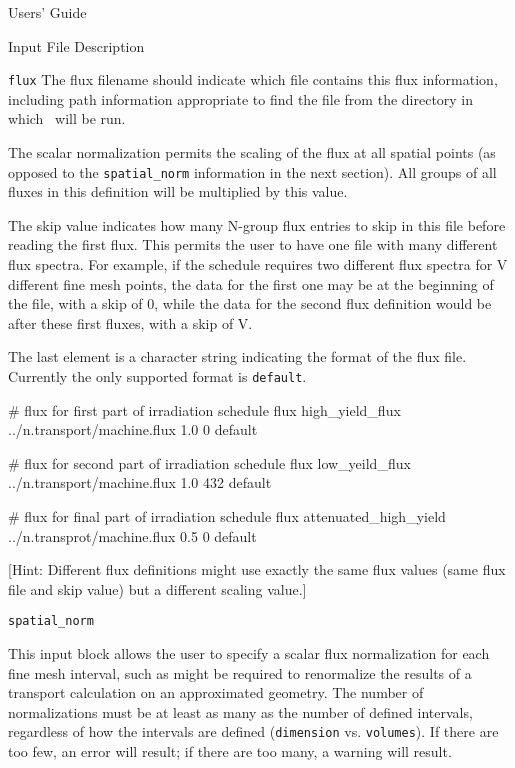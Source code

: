 \begin{chapter}{Users' Guide\label{app:user.guide}}
\begin{section}{Input File Description\label{app:user.input}}
\begin{subsection}{\texttt{flux}\label{app:user.input.flux}}
      The flux filename should indicate which file contains this flux
      information, including path information appropriate to find the
      file from the directory in which \ALARA\ will be run.

      The scalar normalization permits the scaling of the flux at all
      spatial points (as opposed to the \texttt{spatial\_norm}
      information in the next section).  All groups of all fluxes in
      this definition will be multiplied by this value.
      
      The skip value indicates how many N-group flux entries to skip
      in this file before reading the first flux.  This permits the
      user to have one file with many different flux spectra.  For
      example, if the schedule requires two different flux spectra for
      V different fine mesh points, the data for the first one may be
      at the beginning of the file, with a skip of 0, while the data
      for the second flux definition would be after these first
      fluxes, with a skip of V.
      
      The last element is a character string indicating the format of
      the flux file.  Currently the only supported format is
      \texttt{default}.

      \begin{center}
        \renewcommand{\baselinestretch}{1}\normalsize
        \begin{boxedverbatim}
# flux for first part of irradiation schedule
flux high_yield_flux ../n.transport/machine.flux 1.0 0 default

# flux for second part of irradiation schedule
flux low_yeild_flux ../n.transport/machine.flux 1.0 432 default

# flux for final part of irradiation schedule
flux attenuated_high_yield ../n.transprot/machine.flux 0.5 0 default
\end{boxedverbatim}
      \end{center}
      
      [Hint: Different flux definitions might use exactly the same
      flux values (same flux file and skip value) but a different
      scaling value.]
    \end{subsection}

    \begin{subsection}{\texttt{spatial\_norm}\label{app:user.input.norm}}
      
      This input block allows the user to specify a scalar flux
      normalization for each fine mesh interval, such as might be
      required to renormalize the results of a transport calculation
      on an approximated geometry.  The number of normalizations must
      be at least as many as the number of defined intervals,
      regardless of how the intervals are defined (\texttt{dimension}
      vs. \texttt{volumes}).  If there are too few, an error will
      result; if there are too many, a warning will result.
      

\end{subsection}
\end{section}
\end{chapter}
